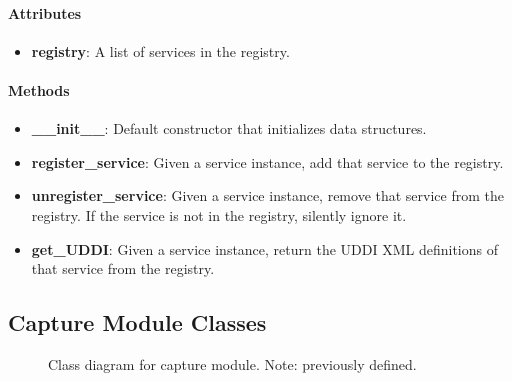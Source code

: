 \documentclass[titlepage]{article}
\newcommand{\umlclass}[5][,]{
    \node [umlclass,#1] (#2) {
        \textbf{#3}
        \nodepart{second}
        \begin{description*}
        #4
        \end{description*}
        \nodepart{third}
        \begin{description*}
        #5
        \end{description*}
    };
}
\newcommand{\umlattr}[3]{
    \item[$#1$]\textbf{#2}: \textit{#3}
}
\newcommand{\umlmethod}[4]{
    \item[$#1$]\textbf{#2}({#3}): \textit{#4}
}
\newcommand{\umlarg}[2]{\textit{#1} #2}
\newcommand{\umlrelation}[6][-|]{
    \path [#3] (#2) #1 (#4)
        node [very near start, auto=right] {#5}
        node [very near end, auto=right] {#6};
}
\begin{document}
\paragraph{Attributes}
\begin{itemize}
    \item \textbf{registry}: A list of services in the registry.
\end{itemize}

\paragraph{Methods}
\begin{itemize}
    \item \textbf{\_\_init\_\_}: Default constructor that initializes data
        structures.
    \item \textbf{register\_service}: Given a service instance, add that
        service to the registry.
    \item \textbf{unregister\_service}: Given a service instance, remove that
        service from the registry.  If the service is not in the registry,
        silently ignore it.
    \item \textbf{get\_UDDI}: Given a service instance, return the UDDI XML
        definitions of that service from the registry.
\end{itemize}


\clearpage

\subsection{Capture Module Classes
    \label{capture_classes}
}

\begin{figure}
    \centering
    \caption{Class diagram for capture module.  Note:
        previously defined.}
    \label{fig-capturemodule}
\end{figure}
\end{document}
